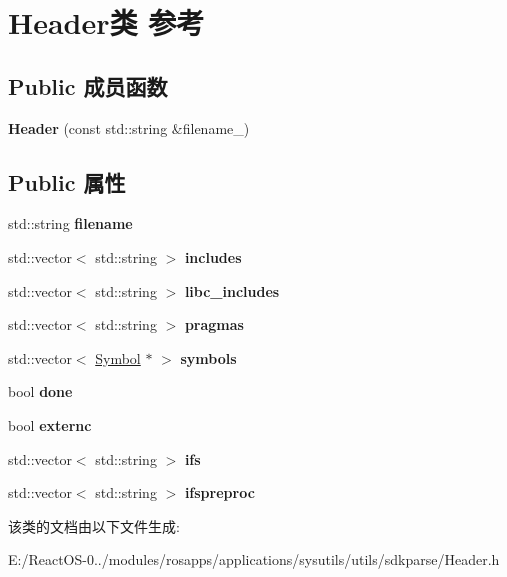 \hypertarget{class_header}{}\section{Header类 参考}
\label{class_header}
\subsection*{Public 成员函数}
\begin{DoxyCompactItemize}
\item 
\mbox{\label{class_header_a698b57f95d74baabbf0e3bfc7f1cc523}} 
{\bfseries Header} (const std\+::string \&filename\+\_\+)
\end{DoxyCompactItemize}
\subsection*{Public 属性}
\begin{DoxyCompactItemize}
\item 
\mbox{\label{class_header_a6645bdf1e1d595981ed29c096fff5458}} 
std\+::string {\bfseries filename}
\item 
\mbox{\label{class_header_a4fc17602220237b872add35934dd317f}} 
std\+::vector$<$ std\+::string $>$ {\bfseries includes}
\item 
\mbox{\label{class_header_aebb19173a6910f2af48978baac1c342d}} 
std\+::vector$<$ std\+::string $>$ {\bfseries libc\+\_\+includes}
\item 
\mbox{\label{class_header_a96dd8145d82a1ef65062cd034605cf18}} 
std\+::vector$<$ std\+::string $>$ {\bfseries pragmas}
\item 
\mbox{\label{class_header_ad3ca514ad40f22647e9e10e534ba2cef}} 
std\+::vector$<$ \hyperlink{class_symbol}{Symbol} $\ast$ $>$ {\bfseries symbols}
\item 
\mbox{\label{class_header_a22b7ff927590fa8ad9751a927adc10ec}} 
bool {\bfseries done}
\item 
\mbox{\label{class_header_ad629dfb2a647f642cc69b300f71a1e1c}} 
bool {\bfseries externc}
\item 
\mbox{\label{class_header_afa91217b736ed2f3ecd01c6d6178b1f5}} 
std\+::vector$<$ std\+::string $>$ {\bfseries ifs}
\item 
\mbox{\label{class_header_af4efacf523ab1bee8acc967d80691b10}} 
std\+::vector$<$ std\+::string $>$ {\bfseries ifspreproc}
\end{DoxyCompactItemize}


该类的文档由以下文件生成\+:\begin{DoxyCompactItemize}
\item 
E\+:/\+React\+O\+S-\/0../modules/rosapps/applications/sysutils/utils/sdkparse/Header.\+h\end{DoxyCompactItemize}
